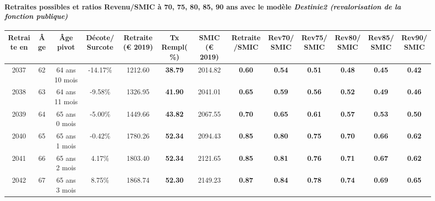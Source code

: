 \paragraph{Retraites possibles et ratios Revenu/SMIC à 70, 75, 80, 85, 90 ans avec le modèle \emph{Destinie2 (revalorisation de la fonction publique)}}  
 
{ \scriptsize \begin{center} 
\begin{tabular}[htb]{|c|c||c|c||c|c||c||c|c|c|c|c|c|} 
\hline 
 Retraite en &  Âge &  Âge pivot &  Décote/Surcote &  Retraite (\euro{} 2019) &  Tx Rempl(\%) &  SMIC (\euro{} 2019) &  Retraite/SMIC &  Rev70/SMIC &  Rev75/SMIC &  Rev80/SMIC &  Rev85/SMIC &  Rev90/SMIC \\ 
\hline \hline 
 2037 &  62 &  64 ans 10 mois &  -14.17\% &  1212.60 &  {\bf 38.79} &  2014.82 &  {\bf {\color{red} 0.60}} &  {\bf {\color{red} 0.54}} &  {\bf {\color{red} 0.51}} &  {\bf {\color{red} 0.48}} &  {\bf {\color{red} 0.45}} &  {\bf {\color{red} 0.42}} \\ 
\hline 
 2038 &  63 &  64 ans 11 mois &  -9.58\% &  1326.95 &  {\bf 41.90} &  2041.01 &  {\bf {\color{red} 0.65}} &  {\bf {\color{red} 0.59}} &  {\bf {\color{red} 0.56}} &  {\bf {\color{red} 0.52}} &  {\bf {\color{red} 0.49}} &  {\bf {\color{red} 0.46}} \\ 
\hline 
 2039 &  64 &  65 ans 0 mois &  -5.00\% &  1449.66 &  {\bf 43.82} &  2067.55 &  {\bf {\color{red} 0.70}} &  {\bf {\color{red} 0.65}} &  {\bf {\color{red} 0.61}} &  {\bf {\color{red} 0.57}} &  {\bf {\color{red} 0.53}} &  {\bf {\color{red} 0.50}} \\ 
\hline 
 2040 &  65 &  65 ans 1 mois &  -0.42\% &  1780.26 &  {\bf 52.34} &  2094.43 &  {\bf {\color{red} 0.85}} &  {\bf {\color{red} 0.80}} &  {\bf {\color{red} 0.75}} &  {\bf {\color{red} 0.70}} &  {\bf {\color{red} 0.66}} &  {\bf {\color{red} 0.62}} \\ 
\hline 
 2041 &  66 &  65 ans 2 mois &  4.17\% &  1803.40 &  {\bf 52.34} &  2121.65 &  {\bf {\color{red} 0.85}} &  {\bf {\color{red} 0.81}} &  {\bf {\color{red} 0.76}} &  {\bf {\color{red} 0.71}} &  {\bf {\color{red} 0.67}} &  {\bf {\color{red} 0.62}} \\ 
\hline 
 2042 &  67 &  65 ans 3 mois &  8.75\% &  1868.74 &  {\bf 52.30} &  2149.23 &  {\bf {\color{red} 0.87}} &  {\bf {\color{red} 0.84}} &  {\bf {\color{red} 0.78}} &  {\bf {\color{red} 0.74}} &  {\bf {\color{red} 0.69}} &  {\bf {\color{red} 0.65}} \\ 
\hline 
\hline 
\end{tabular} 
\end{center} } 


